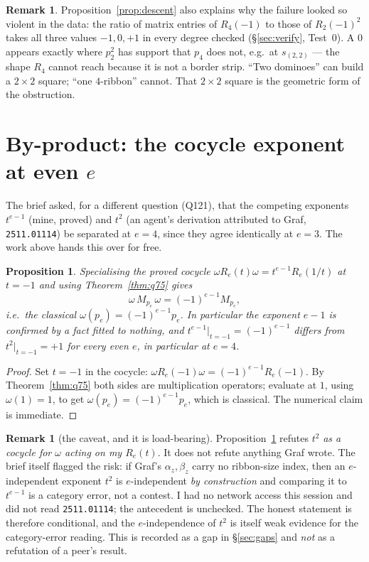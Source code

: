 \documentclass[11pt]{article}
\newtheorem{proposition}[theorem]{Proposition}
\theoremstyle{definition}
\newtheorem{remark}[theorem]{Remark}
\newcommand{\Mult}[1]{M_{#1}}
\begin{document}
\begin{remark}
Proposition~\ref{prop:descent} also explains why the failure looked so violent in the data:
the ratio of matrix entries of $R_4(-1)$ to those of $R_2(-1)^{2}$ takes all three values
$-1,0,+1$ in every degree checked (\S\ref{sec:verify}, Test~0).  A $0$ appears exactly where
$p_2^{2}$ has support that $p_4$ does not, e.g.\ at $s_{(2,2)}$ --- the shape $R_4$ cannot
reach because it is not a border strip.  ``Two dominoes'' can build a $2\times2$ square;
``one $4$-ribbon'' cannot.  That $2\times2$ square is the geometric form of the obstruction.
\end{remark}

\section{By-product: the cocycle exponent at even $e$}\label{sec:sep}

The brief asked, for a different question (Q121), that the competing exponents $t^{e-1}$
(mine, proved) and $t^{2}$ (an agent's derivation attributed to Graf, \texttt{2511.01114})
be separated at $e=4$, since they agree identically at $e=3$.  The work above hands this over
for free.

\begin{proposition}\label{prop:sep}
Specialising the proved cocycle $\omega R_e(t)\omega=t^{e-1}R_e(1/t)$ at $t=-1$ and using
Theorem~\ref{thm:q75} gives
\[
  \omega\,\Mult{p_e}\,\omega=(-1)^{e-1}\Mult{p_e},
\]
i.e.\ the classical $\omega(p_e)=(-1)^{e-1}p_e$.  In particular the exponent $e-1$ is
confirmed by a fact fitted to nothing, and $t^{e-1}\big|_{t=-1}=(-1)^{e-1}$ differs from
$t^{2}\big|_{t=-1}=+1$ for every even $e$, in particular at $e=4$.
\end{proposition}

\begin{proof}
Set $t=-1$ in the cocycle: $\omega R_e(-1)\omega=(-1)^{e-1}R_e(-1)$.  By
Theorem~\ref{thm:q75} both sides are multiplication operators; evaluate at $1$, using
$\omega(1)=1$, to get $\omega(p_e)=(-1)^{e-1}p_e$, which is classical.  The numerical claim
is immediate.
\end{proof}

\begin{remark}[the caveat, and it is load-bearing]\label{rem:caveat}
Proposition~\ref{prop:sep} refutes $t^{2}$ \emph{as a cocycle for $\omega$ acting on my
$R_e(t)$}.  It does not refute anything Graf wrote.  The brief itself flagged the risk: if
Graf's $\alpha_z,\beta_z$ carry no ribbon-size index, then an $e$-independent exponent $t^{2}$
is $e$-independent \emph{by construction} and comparing it to $t^{e-1}$ is a category error,
not a contest.  I had no network access this session and did not read
\texttt{2511.01114}; the antecedent is unchecked.  The honest statement is therefore
conditional, and the $e$-independence of $t^2$ is itself weak evidence for the category-error
reading.  This is recorded as a gap in \S\ref{sec:gaps} and \emph{not} as a refutation of a
peer's result.
\end{remark}
\end{document}
